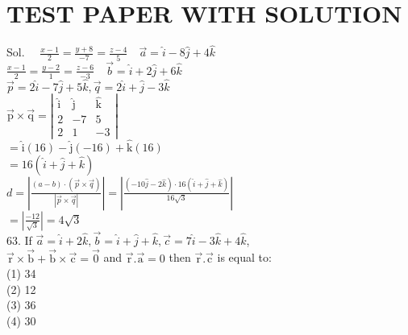 \documentclass[10pt]{article}
\begin{document}
\section*{TEST PAPER WITH SOLUTION}
Sol. \(\quad \frac{x-1}{2}=\frac{y+8}{-7}=\frac{z-4}{5} \quad \vec{a}=\hat{i}-8 \hat{j}+4 \hat{k}\)\\
\(\frac{x-1}{2}=\frac{y-2}{1}=\frac{z-6}{-3} \quad \vec{b}=\hat{i}+2 \hat{j}+6 \hat{k}\)\\
\(\vec{p}=2 \hat{i}-7 \hat{j}+5 \hat{k}, \vec{q}=2 \hat{i}+\hat{j}-3 \hat{k}\)\\
\(\overrightarrow{\mathrm{p}} \times \overrightarrow{\mathrm{q}}=\left|\begin{array}{ccc}\hat{\mathrm{i}} & \hat{\mathrm{j}} & \hat{\mathrm{k}} \\ 2 & -7 & 5 \\ 2 & 1 & -3\end{array}\right|\)\\
\(=\hat{\mathrm{i}}(16)-\hat{\mathrm{j}}(-16)+\hat{\mathrm{k}}(16)\)\\
\(=16(\hat{i}+\hat{j}+\hat{k})\)\\
\(d=\left|\frac{(a-b) \cdot(\vec{p} \times \vec{q})}{|\vec{p} \times \vec{q}|}\right|=\left|\frac{(-10 \hat{j}-2 \hat{k}) \cdot 16(\hat{i}+\hat{j}+\hat{k})}{16 \sqrt{3}}\right|\)\\
\(=\left|\frac{-12}{\sqrt{3}}\right|=4 \sqrt{3}\)\\
63. If \(\vec{a}=\hat{i}+2 \hat{k}, \vec{b}=\hat{i}+\hat{j}+\hat{k}, \vec{c}=7 \hat{i}-3 \hat{k}+4 \hat{k}\),\\
\(\overrightarrow{\mathrm{r}} \times \overrightarrow{\mathrm{b}}+\overrightarrow{\mathrm{b}} \times \overrightarrow{\mathrm{c}}=\overrightarrow{0}\) and \(\overrightarrow{\mathrm{r}} . \overrightarrow{\mathrm{a}}=0\) then \(\overrightarrow{\mathrm{r}} . \overrightarrow{\mathrm{c}}\) is equal to:\\
(1) 34\\
(2) 12\\
(3) 36\\
(4) 30
\end{document}
